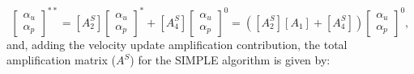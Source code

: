 \documentclass[final,3p,times,11pt,onecolumn]{myElsarticle}
\numberwithin{equation}{section}
\begin{document}
\begin{equation}
\begin{bmatrix}
\alpha_u \\
\alpha_p 
\end{bmatrix}^{**} =
[A^S_2]
\begin{bmatrix}
\alpha_u \\
\alpha_p 
\end{bmatrix}^{*} +
[A^S_4]
\begin{bmatrix}
\alpha_u \\
\alpha_p 
\end{bmatrix}^{0} =
([A^S_2] [A_1] + [A^S_4])
\begin{bmatrix}
\alpha_u \\
\alpha_p 
\end{bmatrix}^{0},
\end{equation}
and, adding the velocity update amplification contribution, the total amplification matrix ($A^S$) for the SIMPLE algorithm is given by:
\end{document}
